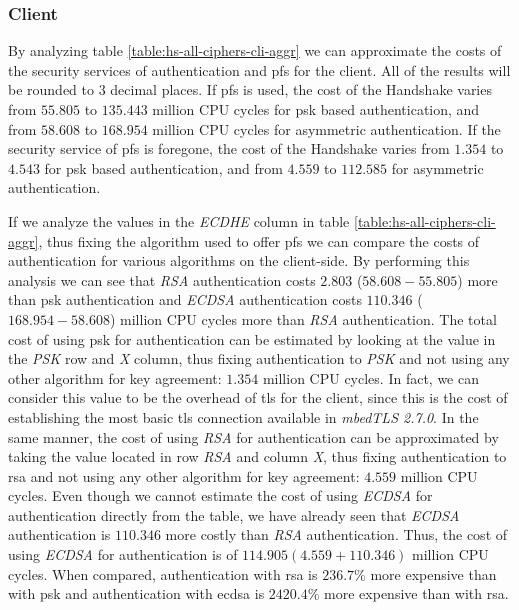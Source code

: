 \subsubsection{Client}

By analyzing table \ref{table:hs-all-ciphers-cli-aggr} we can approximate
the costs of the security services of authentication and \gls{pfs} for the client.
All of the results will be rounded to $3$ decimal places.
If \gls{pfs} is used, the cost of the Handshake varies from $55.805$ to $135.443$
million CPU cycles for \gls{psk} based authentication, and from $58.608$ to $168.954$ million CPU cycles for
asymmetric authentication. If the security service of \gls{pfs} is foregone, the cost
of the Handshake varies from $1.354$ to $4.543$ for \gls{psk} based authentication,
and from $4.559$ to $112.585$ for asymmetric authentication.

If we analyze the values in the \textit{ECDHE} column in table \ref{table:hs-all-ciphers-cli-aggr}, thus fixing the
algorithm used to offer \gls{pfs} we can compare the costs of authentication for various algorithms on the client-side.
By performing this analysis we can see that \textit{RSA} authentication costs $2.803$  ($58.608 - 55.805$)
more than \gls{psk} authentication and \textit{ECDSA} authentication costs $110.346$ ($168.954 - 58.608$)
million CPU cycles more than
\textit{RSA} authentication. The total cost of using \gls{psk} for authentication can be estimated by looking at the
value in the \textit{PSK} row and \textit{X} column, thus fixing authentication to \textit{PSK} and not using any other
algorithm for key agreement: $1.354$ million CPU cycles. In fact, we can consider this value to be the overhead of \gls{tls} for the client,
since this is the cost of establishing the most basic \gls{tls} connection available in \textit{mbedTLS 2.7.0}.
In the same manner, the cost of using \textit{RSA} for authentication can
be approximated by taking the value located in row \textit{RSA} and column \textit{X}, thus fixing authentication
to \gls{rsa} and not using any other algorithm for key agreement: $4.559$ million CPU cycles. Even though we cannot estimate the cost
of using \textit{ECDSA} for authentication directly from the table, we have already seen that \textit{ECDSA} authentication
is $110.346$ more costly than \textit{RSA} authentication. Thus, the cost of using \textit{ECDSA} for authentication
is of $114.905 (4.559+110.346)$ million CPU cycles. When compared, authentication with \gls{rsa} is
$236.7\%$ more expensive than with \gls{psk} and authentication with \gls{ecdsa} is $2420.4\%$ more
expensive than with \gls{rsa}.

